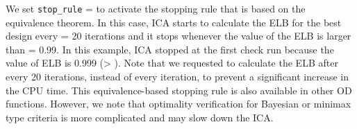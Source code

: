 We set \texttt{stop\_rule} =  to activate the stopping rule that is based on the equivalence theorem. In this case,  ICA starts to  calculate the ELB for the best design every  = 20 iterations  and it  stops whenever the value of the ELB is larger than   = 0.99.  In this example, ICA stopped at the first check run because the value of ELB is 0.999 (> ).
Note that we requested to calculate the ELB after every 20 iterations, instead of every iteration, to prevent a significant increase in the CPU time.
This equivalence-based  stopping rule is  also available in other OD functions. However, we note that optimality verification  for  Bayesian or   minimax   type criteria is more complicated and may slow down the ICA.


